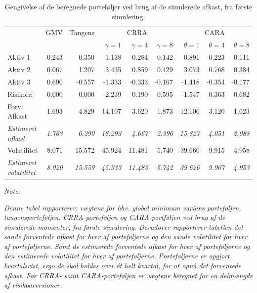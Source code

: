 \documentclass[
  a4paper,
  oneside]{memoir}
\begin{document}
\begin{table}[!h]

\caption{\label{tab:sum-1}Gengivelse af de beregnede porteføljer ved brug af de simulerede afkast, fra første simulering.}
\centering
\begin{threeparttable}
\begin{tabular}[t]{lrrrrrrrr}
\toprule
\multicolumn{1}{c}{ } & \multicolumn{1}{c}{GMV} & \multicolumn{1}{c}{Tangens} & \multicolumn{3}{c}{CRRA} & \multicolumn{3}{c}{CARA} \\
\cmidrule(l{3pt}r{3pt}){2-2} \cmidrule(l{3pt}r{3pt}){3-3} \cmidrule(l{3pt}r{3pt}){4-6} \cmidrule(l{3pt}r{3pt}){7-9}
  &   &   & $\gamma=1$ & $\gamma=4$ & $\gamma=8$ & $\theta=1$ & $\theta=4$ & $\theta=8$\\
\midrule
\rowcolor{gray!6}  Aktiv 1 & 0.243 & 0.350 & 1.138 & 0.284 & 0.142 & 0.891 & 0.223 & 0.111\\
Aktiv 2 & 0.067 & 1.207 & 3.435 & 0.859 & 0.429 & 3.073 & 0.768 & 0.384\\
\rowcolor{gray!6}  Aktiv 3 & 0.690 & -0.557 & -1.333 & -0.333 & -0.167 & -1.418 & -0.354 & -0.177\\
Risikofri & 0.000 & 0.000 & -2.239 & 0.190 & 0.595 & -1.547 & 0.363 & 0.682\\
\rowcolor{gray!6}  Forv. Afkast & 1.693 & 4.829 & 14.107 & 3.620 & 1.873 & 12.106 & 3.120 & 1.623\\
\em{Estimeret afkast} & \em{1.763} & \em{6.290} & \em{18.293} & \em{4.667} & \em{2.396} & \em{15.827} & \em{4.051} & \em{2.088}\\
\rowcolor{gray!6}  Volatilitet & 8.071 & 15.572 & 45.924 & 11.481 & 5.740 & 39.660 & 9.915 & 4.958\\
\em{Estimeret volatilitet} & \em{8.020} & \em{15.559} & \em{45.933} & \em{11.483} & \em{5.742} & \em{39.626} & \em{9.907} & \em{4.953}\\
\bottomrule
\end{tabular}
\begin{tablenotes}
\item \textit{Note: } 
\item \textit{Denne tabel rapporterer: vægtene for hhv. global minimum varians porteføljen, tangensporteføljen, CRRA-porteføljen og CARA-portføljen ved brug af de simulerede momenter, fra første simulering. Derudover rapporterer tabellen det sande forventede afkast for hver af porteføljerne og den sande volatilitet for hver af porteføljerne.  Samt de estimerede forventede afkast for hver af porteføljerne og den estimerede volatilitet for hver af porteføljerne. Porteføljerne er opgjort kvartalsvist, ergo de skal holdes over ét helt kvartal, for at opnå det forventede afkast. For CRRA- samt CARA-porteføljen er vægtene beregnet for en delmængde af risikoaversioner.}
\end{tablenotes}
\end{threeparttable}
\end{table}
\end{document}
